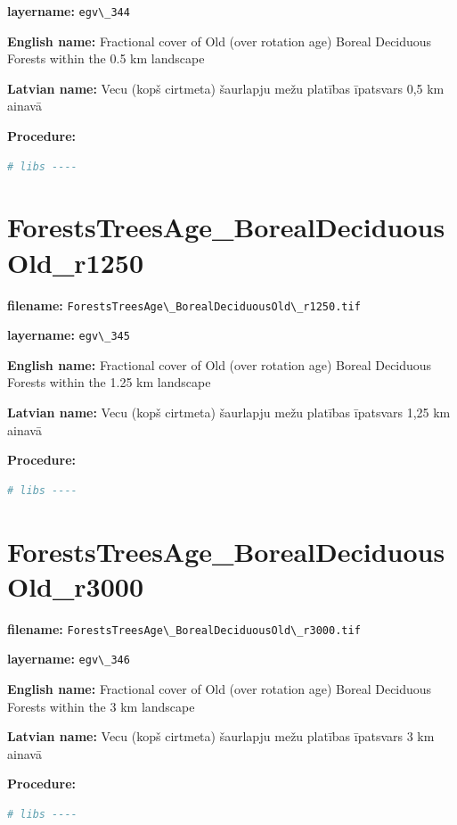 \documentclass[
]{book}
\newcommand{\passthrough}[1]{#1}
\begin{document}
\textbf{layername:} \passthrough{\lstinline!egv\_344!}

\textbf{English name:} Fractional cover of Old (over rotation age) Boreal Deciduous Forests within the 0.5 km landscape

\textbf{Latvian name:} Vecu (kopš cirtmeta) šaurlapju mežu platības īpatsvars 0,5 km ainavā

\textbf{Procedure:}

\begin{lstlisting}[language=R]
# libs ----
\end{lstlisting}

\section{ForestsTreesAge\_BorealDeciduousOld\_r1250}\label{ch06.345}

\textbf{filename:} \passthrough{\lstinline!ForestsTreesAge\_BorealDeciduousOld\_r1250.tif!}

\textbf{layername:} \passthrough{\lstinline!egv\_345!}

\textbf{English name:} Fractional cover of Old (over rotation age) Boreal Deciduous Forests within the 1.25 km landscape

\textbf{Latvian name:} Vecu (kopš cirtmeta) šaurlapju mežu platības īpatsvars 1,25 km ainavā

\textbf{Procedure:}

\begin{lstlisting}[language=R]
# libs ----
\end{lstlisting}

\section{ForestsTreesAge\_BorealDeciduousOld\_r3000}\label{ch06.346}

\textbf{filename:} \passthrough{\lstinline!ForestsTreesAge\_BorealDeciduousOld\_r3000.tif!}

\textbf{layername:} \passthrough{\lstinline!egv\_346!}

\textbf{English name:} Fractional cover of Old (over rotation age) Boreal Deciduous Forests within the 3 km landscape

\textbf{Latvian name:} Vecu (kopš cirtmeta) šaurlapju mežu platības īpatsvars 3 km ainavā

\textbf{Procedure:}

\begin{lstlisting}[language=R]
# libs ----
\end{lstlisting}
\end{document}
